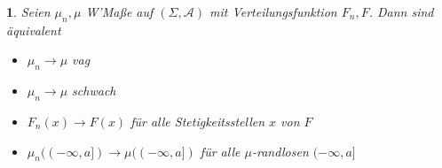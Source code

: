 \documentclass[10pt,a4paper]{report}
\numberwithin{equation}{section}
\numberwithin{figure}{section}
\theoremstyle{plain}
\theoremstyle{definition}
\theoremstyle{remark}
\theoremstyle{plain}
\newtheorem{cor}[thm]{\protect\corollaryname}
\providecommand{\corollaryname}{Korollar}
\newcommand{\1}{ \mathbb{1} } %
\begin{document}
\begin{cor}
  Seien $\mu_n,\mu$ W'Maße auf $(\Sigma,\mathcal{A})$ mit
  Verteilungsfunktion $F_n,F$. Dann sind äquivalent
  \begin{itemize}
  \item[1)] $\mu_n \to \mu$ vag
  \item[2)] $\mu_n \to \mu$ schwach
  \item[3)] $F_n(x) \to F(x)$ für alle Stetigkeitsstellen $x$ von $F$
  \item[4)] $\mu_n((-\infty,a])\to \mu((-\infty,a])$ für alle
    $\mu$-randlosen $(-\infty,a]$
  \end{itemize}
\end{cor}
\end{document}
